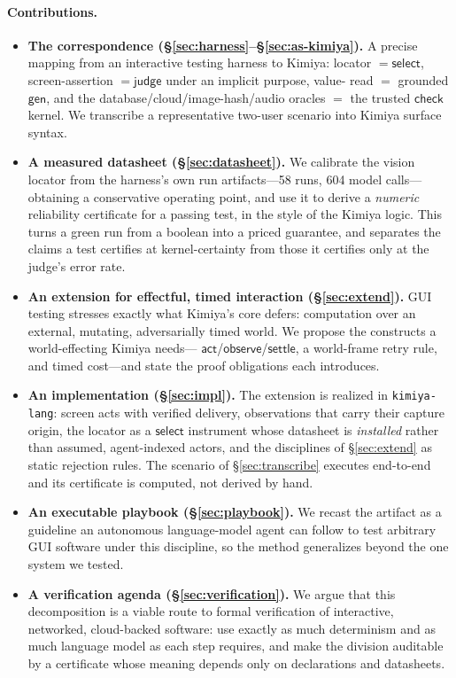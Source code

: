 \documentclass[acmsmall,screen,nonacm]{acmart}
\newcommand{\gen}{\mathsf{gen}}
\newcommand{\checkk}{\mathsf{check}}
\newcommand{\judge}{\mathsf{judge}}
\newcommand{\select}{\mathsf{select}}
\newcommand{\actc}{\mathsf{act}}
\newcommand{\observe}{\mathsf{observe}}
\newcommand{\settle}{\mathsf{settle}}
\theoremstyle{acmdefinition}%
\theoremstyle{acmplain}%
\begin{document}
\paragraph{Contributions.}
\begin{itemize}
\item \textbf{The correspondence (\S\ref{sec:harness}--\S\ref{sec:as-kimiya}).}
A precise mapping from an interactive testing harness to Kimiya: locator
$=\select$, screen-assertion $=\judge$ under an implicit purpose, value-
read $=$ grounded $\gen$, and the database/cloud/image-hash/audio oracles
$=$ the trusted $\checkk$ kernel. We transcribe a representative two-user
scenario into Kimiya surface syntax.
\item \textbf{A measured datasheet (\S\ref{sec:datasheet}).} We calibrate
the vision locator from the harness's own run artifacts---58 runs, 604
model calls---obtaining a conservative operating point, and use it to
derive a \emph{numeric} reliability certificate for a passing test, in
the style of the Kimiya logic. This turns a green run from a boolean into
a priced guarantee, and separates the claims a test certifies at
kernel-certainty from those it certifies only at the judge's error rate.
\item \textbf{An extension for effectful, timed interaction
(\S\ref{sec:extend}).} GUI testing stresses exactly what Kimiya's core
defers: computation over an external, mutating, adversarially timed
world. We propose the constructs a world-effecting Kimiya needs---
$\actc$/$\observe$/$\settle$, a world-frame retry rule, and timed
cost---and state the proof obligations each introduces.
\item \textbf{An implementation (\S\ref{sec:impl}).} The extension is
realized in \texttt{kimiya-lang}: screen acts with verified delivery,
observations that carry their capture origin, the locator as a
$\select$ instrument whose datasheet is \emph{installed} rather than
assumed, agent-indexed actors, and the disciplines of
\S\ref{sec:extend} as static rejection rules. The scenario of
\S\ref{sec:transcribe} executes end-to-end and its certificate is
computed, not derived by hand.
\item \textbf{An executable playbook (\S\ref{sec:playbook}).} We recast
the artifact as a guideline an autonomous language-model agent can follow
to test arbitrary GUI software under this discipline, so the method
generalizes beyond the one system we tested.
\item \textbf{A verification agenda (\S\ref{sec:verification}).} We argue
that this decomposition is a viable route to formal verification of
interactive, networked, cloud-backed software: use exactly as much
determinism and as much language model as each step requires, and make
the division auditable by a certificate whose meaning depends only on
declarations and datasheets.
\end{itemize}
\end{document}

